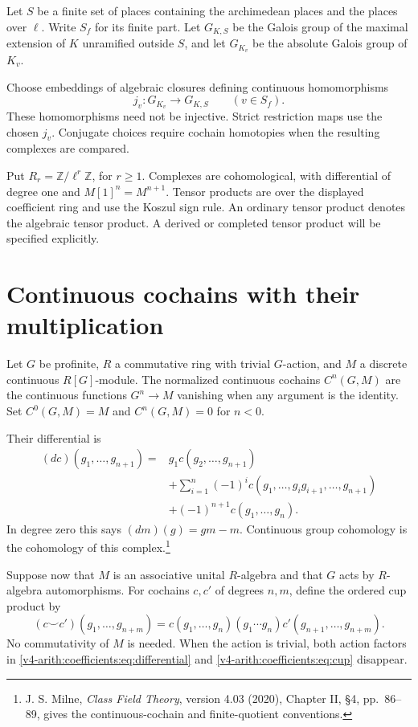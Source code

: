 Let \(S\) be a finite set of places containing the archimedean places
and the places over \(\ell\). Write \(S_f\) for its finite part.
Let \(G_{K,S}\) be the Galois group of the maximal extension of \(K\)
unramified outside \(S\), and let \(G_{K_v}\) be the absolute Galois
group of \(K_v\).

Choose embeddings of algebraic closures defining
continuous homomorphisms
\[
 j_v:G_{K_v}\longrightarrow G_{K,S}\qquad(v\in S_f).
\]
These homomorphisms need not be injective. Strict restriction maps use
the chosen \(j_v\). Conjugate choices require cochain homotopies when
the resulting complexes are compared.

Put \(R_r=\mathbb Z/\ell^r\mathbb Z\), for \(r\geq1\).
Complexes are cohomological, with differential of degree one and
\(M[1]^n=M^{n+1}\). Tensor products are over the displayed coefficient
ring and use the Koszul sign rule. An ordinary tensor product denotes
the algebraic tensor product. A derived or completed tensor product
will be specified explicitly.

\section{Continuous cochains with their multiplication}
\label{v4-arith:coefficients:sec:cochains}

Let \(G\) be profinite, \(R\) a commutative ring with trivial
\(G\)-action, and \(M\) a discrete continuous \(R[G]\)-module.
The normalized continuous cochains \(C^n(G,M)\) are the continuous
functions \(G^n\to M\) vanishing when any argument is the identity.
Set \(C^0(G,M)=M\) and \(C^n(G,M)=0\) for \(n<0\).

Their differential is
\begin{align}
 (dc)(g_1,\ldots,g_{n+1})={}&g_1c(g_2,\ldots,g_{n+1})\nonumber\\
 &+\sum_{i=1}^n(-1)^i
 c(g_1,\ldots,g_ig_{i+1},\ldots,g_{n+1})\nonumber\\
 &+(-1)^{n+1}c(g_1,\ldots,g_n).
 \label{v4-arith:coefficients:eq:differential}
\end{align}
In degree zero this says \((dm)(g)=gm-m\).
Continuous group cohomology is the cohomology of this complex.\footnote{
J. S. Milne, \emph{Class Field Theory}, version 4.03 (2020),
Chapter II, \S4, pp.~86--89, gives the continuous-cochain and
finite-quotient conventions.}

Suppose now that \(M\) is an associative unital \(R\)-algebra and
that \(G\) acts by \(R\)-algebra automorphisms. For cochains \(c,c'\)
of degrees \(n,m\), define the ordered cup product by
\begin{equation}\label{v4-arith:coefficients:eq:cup}
 (c\smile c')(g_1,\ldots,g_{n+m})
 =c(g_1,\ldots,g_n)
   (g_1\cdots g_n)c'(g_{n+1},\ldots,g_{n+m}).
\end{equation}
No commutativity of \(M\) is needed. When the action is trivial, both
action factors in \eqref{v4-arith:coefficients:eq:differential}
and \eqref{v4-arith:coefficients:eq:cup} disappear.

